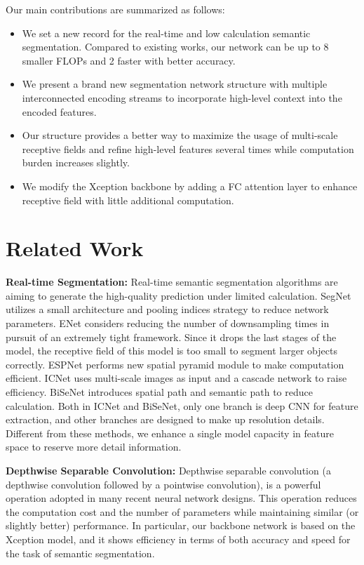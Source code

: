 \documentclass[10pt,twocolumn,letterpaper]{article}
\begin{document}
Our main contributions are summarized as follows:
\begin{itemize}

\item We set a new record for the real-time and low calculation semantic segmentation. Compared to existing works, our network can be up to 8 smaller FLOPs and 2 faster with better accuracy.
\item We present a brand new segmentation network structure with multiple interconnected encoding streams to incorporate high-level context into the encoded features.
\item Our structure provides a better way to maximize the usage of multi-scale receptive fields and refine high-level features several times while computation burden increases slightly. 
\item We modify the Xception backbone by adding a FC attention layer to enhance receptive field with little additional computation.

\end{itemize}

\cvprfinalcopy
\section{Related Work}

\textbf{Real-time Segmentation:} 
Real-time semantic segmentation algorithms are aiming to generate the high-quality prediction under limited calculation. SegNet\cite{segnet} utilizes a small architecture and pooling indices strategy to reduce network parameters. ENet\cite{enet} considers reducing the number of downsampling times in pursuit of an extremely tight framework. Since it drops the last stages of the model, the receptive field of this model is too small to segment larger objects correctly. ESPNet\cite{espnet} performs new spatial pyramid module to make computation efficient. ICNet\cite{ICNet} uses multi-scale images as input and a cascade network to raise efficiency. BiSeNet\cite{BiSeNet} introduces spatial path and semantic path to reduce calculation. Both in ICNet and BiSeNet, only one branch is deep CNN for feature extraction, and other branches are designed to make up resolution details. Different from these methods, we enhance a single model capacity in feature space to reserve more detail information. 

\textbf{Depthwise Separable Convolution:}
Depthwise separable convolution (a depthwise convolution followed by a pointwise convolution), is a powerful operation adopted in many recent neural network designs. This operation reduces the computation cost and the number of parameters while maintaining similar (or slightly better) performance. In particular, our backbone network is based on the Xception model\cite{Xception}, and it shows efficiency in terms of both accuracy and speed for the task of semantic segmentation.
\end{document}
